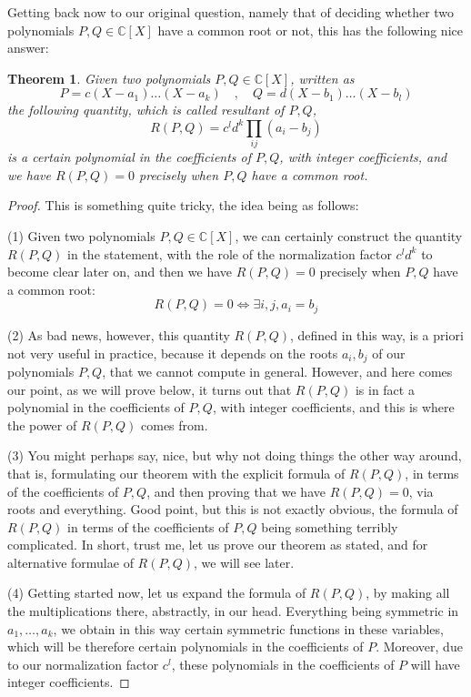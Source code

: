 \documentclass[12pt]{amsbook}
\newtheorem{theorem}{Theorem}[chapter]
\begin{document}
Getting back now to our original question, namely that of deciding whether two polynomials $P,Q\in\mathbb C[X]$ have a common root or not, this has the following nice answer:


\begin{theorem}
Given two polynomials $P,Q\in\mathbb C[X]$, written as
$$P=c(X-a_1)\ldots(X-a_k)\quad,\quad 
Q=d(X-b_1)\ldots(X-b_l)$$
the following quantity, which is called resultant of $P,Q$,
$$R(P,Q)=c^ld^k\prod_{ij}(a_i-b_j)$$
is a certain polynomial in the coefficients of $P,Q$, with integer coefficients, and we have $R(P,Q)=0$ precisely when $P,Q$ have a common root.
\end{theorem}

\begin{proof}
This is something quite tricky, the idea being as follows:

\medskip

(1) Given two polynomials $P,Q\in\mathbb C[X]$, we can certainly construct the quantity $R(P,Q)$ in the statement, with the role of the normalization factor $c^ld^k$ to become clear later on, and then we have $R(P,Q)=0$ precisely when $P,Q$ have a common root:
$$R(P,Q)=0\iff \exists i,j,a_i=b_j$$

(2) As bad news, however, this quantity $R(P,Q)$, defined in this way, is a priori not very useful in practice, because it depends on the roots $a_i,b_j$ of our polynomials $P,Q$, that we cannot compute in general. However, and here comes our point, as we will prove below, it turns out that $R(P,Q)$ is in fact a polynomial in the coefficients of $P,Q$, with integer coefficients, and this is where the power of $R(P,Q)$ comes from.

\medskip

(3) You might perhaps say, nice, but why not doing things the other way around, that is, formulating our theorem with the explicit formula of $R(P,Q)$, in terms of the coefficients of $P,Q$, and then proving that we have $R(P,Q)=0$, via roots and everything. Good point, but this is not exactly obvious, the formula of $R(P,Q)$ in terms of the coefficients of $P,Q$ being something terribly complicated. In short, trust me, let us prove our theorem as stated, and for alternative formulae of $R(P,Q)$, we will see later. 

\medskip

(4) Getting started now, let us expand the formula of $R(P,Q)$, by making all the multiplications there, abstractly, in our head. Everything being symmetric in $a_1,\ldots,a_k$, we obtain in this way certain symmetric functions in these variables, which will be therefore certain polynomials in the coefficients of $P$. Moreover, due to our normalization factor $c^l$, these polynomials in the coefficients of $P$ will have integer coefficients.


\end{proof}
\end{document}
